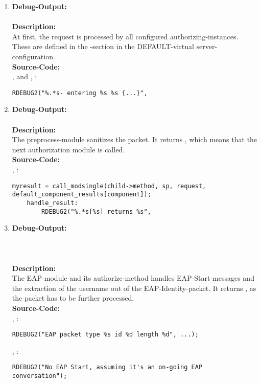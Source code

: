 \begin{enumerate}
\item \textbf{Debug-Output:}\\
\\
\newline
\textbf{Description:}\\
At first, the request is processed by all configured authorizing-instances. These are defined in the -section in the DEFAULT-virtual server-configuration.\\
\newline
\textbf{Source-Code:}\\
,  and , :
\begin{lstlisting}
RDEBUG2("%.*s- entering %s %s {...}",
\end{lstlisting}

\item \textbf{Debug-Output:}\\
\\
\newline
\textbf{Description:}\\
The preprocess-module sanitizes the packet. It returns , which means that the next authorization module is called.\\
\newline
\textbf{Source-Code:}\\
, :
\begin{lstlisting}
myresult = call_modsingle(child->method, sp, request,
default_component_results[component]);
	handle_result:
		RDEBUG2("%.*s[%s] returns %s",
\end{lstlisting}

\item \textbf{Debug-Output:}\\
\\
\\
\\
\newline
\textbf{Description:}\\
The EAP-module and its authorize-method handles EAP-Start-messages and the extraction of the username out of the EAP-Identity-packet. It returns , as the packet has to be further processed.\\
\newline
\textbf{Source-Code:}\\
, :
\begin{lstlisting}
RDEBUG2("EAP packet type %s id %d length %d", ...);
\end{lstlisting}
, :
\begin{lstlisting}
RDEBUG2("No EAP Start, assuming it's an on-going EAP conversation");
\end{lstlisting}


\end{enumerate}
